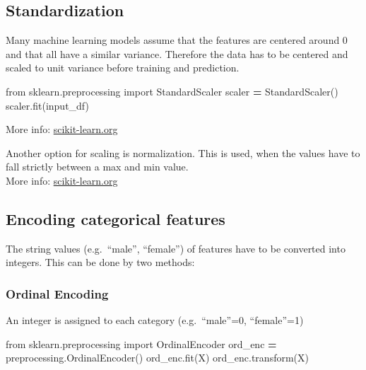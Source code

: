 \documentclass[
]{book}
\newenvironment{Shaded}{\begin{snugshade}}{\end{snugshade}}
\newcommand{\ImportTok}[1]{#1}
\newcommand{\NormalTok}[1]{#1}
\newcommand{\OperatorTok}[1]{\textcolor[rgb]{0.81,0.36,0.00}{\textbf{#1}}}
\begin{document}
\hypertarget{standardization}{%
\subsection{Standardization}\label{standardization}}

Many machine learning models assume that the features are centered
around 0 and that all have a similar variance. Therefore the data has to
be centered and scaled to unit variance before training and prediction.

\begin{Shaded}
\begin{Highlighting}[]
\ImportTok{from}\NormalTok{ sklearn.preprocessing }\ImportTok{import}\NormalTok{ StandardScaler}
\NormalTok{scaler }\OperatorTok{=}\NormalTok{ StandardScaler()}
\NormalTok{scaler.fit(input\_df)}
\end{Highlighting}
\end{Shaded}

More info:
\href{https://scikit-learn.org/stable/modules/generated/sklearn.model_selection.train_test_split.html}{scikit-learn.org}

Another option for scaling is normalization. This is used, when the
values have to fall strictly between a max and min value.\\
More info:
\href{https://scikit-learn.org/stable/modules/preprocessing.html\#normalization}{scikit-learn.org}

\hypertarget{encoding-categorical-features}{%
\subsection{Encoding categorical features}\label{encoding-categorical-features}}

The string values (e.g.~``male'', ``female'') of features have to be
converted into integers. This can be done by two methods:

\hypertarget{ordinal-encoding}{%
\subsubsection{Ordinal Encoding}\label{ordinal-encoding}}

An integer is assigned to each category (e.g.~``male''=0, ``female''=1)

\begin{Shaded}
\begin{Highlighting}[]
\ImportTok{from}\NormalTok{ sklearn.preprocessing }\ImportTok{import}\NormalTok{ OrdinalEncoder}
\NormalTok{ord\_enc }\OperatorTok{=}\NormalTok{ preprocessing.OrdinalEncoder()}
\NormalTok{ord\_enc.fit(X)}
\NormalTok{ord\_enc.transform(X)}
\end{Highlighting}
\end{Shaded}
\end{document}
